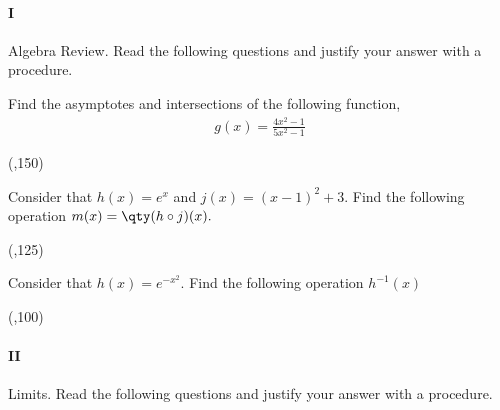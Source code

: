 
\paragraph{I} Algebra Review. Read the following questions and justify your answer with a procedure.

\begin{preguntas}


\pregunta[12] Find the asymptotes and intersections of the following function, 
\begin{gather*}
    g(x) = \frac{4x^2-1}{5x^2-1}
\end{gather*}

\begin{center}
    \framebox(\textwidth,150){}   
\end{center}


\pregunta[12] Consider that $h(x)=e^{x}$ and $j(x)=(x-1)^2+3$. 
Find the following operation \( m(x) = \qty(h\circ j)(x). \)

\begin{center}
    \framebox(\textwidth,125){} 
\end{center}


\newpage

\pregunta[13] Consider that $h(x)=e^{-x^2}$.
Find the following operation \(h^{-1}(x)\)
\begin{center}
    \framebox(\textwidth,100){} 
\end{center}

\end{preguntas}


\paragraph{II} Limits. Read the following questions and justify your answer with a procedure.


